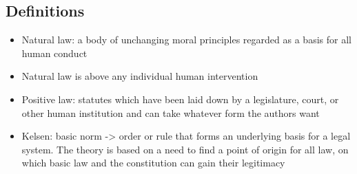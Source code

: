 \documentclass{article}
\begin{document}
\subsection{Definitions}
\begin{itemize}
\item Natural law: a body of unchanging moral principles regarded as a basis for all human conduct 
\item Natural law is above any individual human intervention 
\item Positive law: statutes which have been laid down by a legislature, court, or other human institution and can take whatever form the authors want
\item Kelsen: basic norm -> order or rule that forms an underlying basis for a legal system. The theory is based on a need to find a point of origin for all law, on which basic law and the constitution can gain their legitimacy 
\end{itemize}
\end{document}
